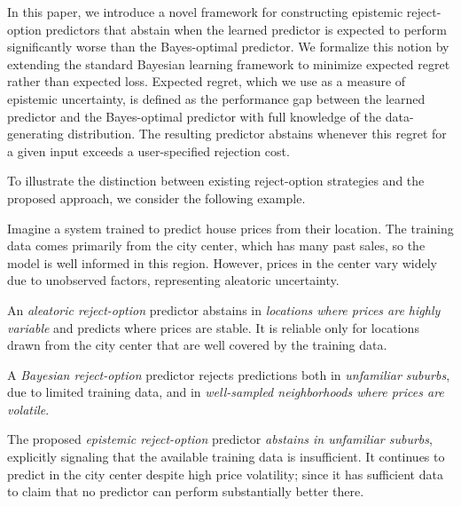 \vspace{-0.1cm}


In this paper, we introduce a novel framework for constructing epistemic reject-option predictors that abstain when the learned predictor is expected to perform significantly worse than the Bayes-optimal predictor. We formalize this notion by extending the standard Bayesian learning framework to minimize expected regret rather than expected loss. Expected regret, which we use as a measure of epistemic uncertainty, is defined as the performance gap between the learned predictor and the Bayes-optimal predictor with full knowledge of the data-generating distribution. The resulting predictor abstains whenever this regret for a given input exceeds a user-specified rejection cost.


To illustrate the distinction between existing reject-option strategies and the proposed approach, we consider the following example.

\begin{example}
Imagine a system trained to predict house prices from their location. The training data comes primarily from the city center, which has many past sales, so the model is well informed in this region. However, prices in the center vary widely due to unobserved factors, representing aleatoric uncertainty.
\vspace{-0.08cm}

An \textit{aleatoric reject-option} predictor abstains in \textit{locations where prices are highly variable} and predicts where prices are stable. It is reliable only for locations drawn from the city center that are well covered by the training data.
\vspace{-0.08cm}

A \textit{Bayesian reject-option} predictor rejects predictions both in \textit{unfamiliar suburbs}, due to limited training data, and in \textit{well-sampled neighborhoods where prices are volatile}.

\vspace{-0.08cm}

The proposed \textit{epistemic reject-option} predictor \textit{abstains in unfamiliar suburbs}, explicitly signaling that the available training data is insufficient. It continues to predict in the city center despite high price volatility; since it has sufficient data to claim that no predictor can perform substantially better there.
\end{example}

